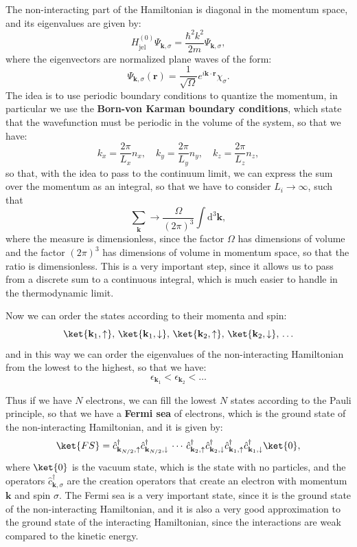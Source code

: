 The non-interacting part of the Hamiltonian is diagonal in the momentum space, and its eigenvalues are given by:
\[
    H_{\text{jel}}^{(0)} \Psi_{\mathbf{k}, \sigma} = \frac{\hbar^2 k^2}{2m} \Psi_{\mathbf{k}, \sigma},
\]
where the eigenvectors are normalized plane waves of the form:
\[
    \Psi_{\mathbf{k}, \sigma}(\mathbf{r}) = \frac{1}{\sqrt{\Omega}} e^{i \mathbf{k} \cdot \mathbf{r}} \chi_\sigma.
\]
The idea is to use periodic boundary conditions to quantize the momentum, in particular we use the \textbf{Born-von Karman boundary conditions}, which state that the wavefunction must be periodic in the volume of the system, so that we have:
\[
    k_x = \frac{2\pi}{L_x} n_x, \quad k_y = \frac{2\pi}{L_y} n_y, \quad k_z = \frac{2\pi}{L_z} n_z,
\]
so that, with the idea to pass to the continuum limit, we can express the sum over the momentum as an integral, so that we have to consider \(L_i \to  \infty\), such that
\[
    \sum_{\mathbf{k}} \to \frac{\Omega}{(2\pi)^3} \int \mathrm{d}^3 \mathbf{k},
\]
where the measure is dimensionless, since the factor \(\Omega\) has dimensions of volume and the factor \((2\pi)^3\) has dimensions of volume in momentum space, so that the ratio is dimensionless. This is a very important step, since it allows us to pass from a discrete sum to a continuous integral, which is much easier to handle in the thermodynamic limit.

Now we can order the states according to their momenta and spin:
\[
    \ket{\mathbf{k}_1, \uparrow}, \, \ket{\mathbf{k}_1, \downarrow}, \, \ket{\mathbf{k}_2, \uparrow}, \, \ket{\mathbf{k}_2, \downarrow}, \, \ldots
\]
and in this way we can order the eigenvalues of the non-interacting Hamiltonian from the lowest to the highest, so that we have:
\[
    \epsilon_{\mathbf{k}_1} < \epsilon_{\mathbf{k}_2} < \ldots
\]

Thus if we have \(N\) electrons, we can fill the lowest \(N\) states according to the Pauli principle, so that we have a \textbf{Fermi sea} of electrons, which is the ground state of the non-interacting Hamiltonian, and it is given by:
\[
    \ket{FS} = \hat{c}_{\mathbf{k}_{N/2}, \uparrow}^\dagger \hat{c}_{\mathbf{k}_{N/2}, \downarrow}^\dagger\, \cdots\, \hat{c}_{\mathbf{k}_2, \uparrow}^\dagger \hat{c}_{\mathbf{k}_2, \downarrow}^\dagger \hat{c}_{\mathbf{k}_1, \uparrow}^\dagger \hat{c}_{\mathbf{k}_1, \downarrow}^\dagger \ket{0},
\]
where \(\ket{0}\) is the vacuum state, which is the state with no particles, and the operators \(\hat{c}_{\mathbf{k}, \sigma}^\dagger\) are the creation operators that create an electron with momentum \(\mathbf{k}\) and spin \(\sigma\). The Fermi sea is a very important state, since it is the ground state of the non-interacting Hamiltonian, and it is also a very good approximation to the ground state of the interacting Hamiltonian, since the interactions are weak compared to the kinetic energy.

